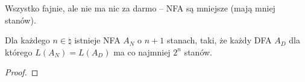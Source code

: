 Wszystko fajnie, ale nie ma nic za darmo -- NFA są mniejsze (mają mniej stanów).
\begin{lemma}
	Dla każdego \( n \in \natural \) istnieje NFA \( A_N \) o \(n + 1\) stanach, taki, że każdy DFA \( A_D \) dla którego \( L(A_N) = L(A_D) \) ma co najmniej \( 2^n \) stanów.
\end{lemma}
\begin{proof}

\end{proof}